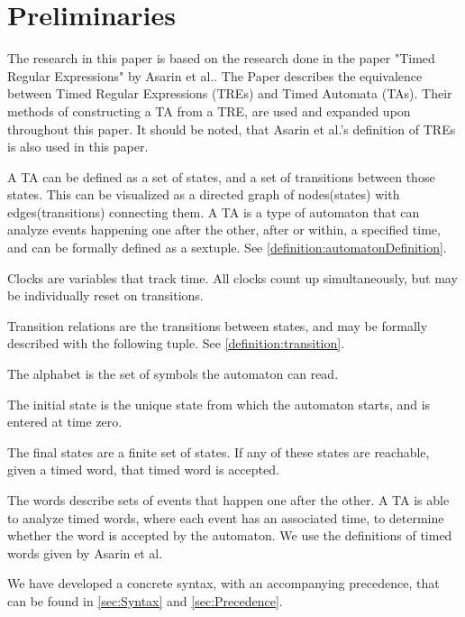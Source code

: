 \section{Preliminaries}\label{sec:preliminaries}






The research in this paper is based on the research done in the paper "Timed Regular Expressions" by Asarin et al.\cite{Eugene2001}. The Paper describes the equivalence between Timed Regular Expressions (TREs) and Timed Automata (TAs). Their methods of constructing a TA from a TRE, are used and expanded upon throughout this paper. It should be noted, that Asarin et al.'s definition of TREs is also used in this paper.

A TA can be defined as a set of states, and a set of transitions between those states. This can be visualized as a directed graph of nodes(states) with edges(transitions) connecting them.
A TA is a type of automaton that can analyze events happening one after the other, after or within, a specified time, and can be formally defined as a sextuple\cite{ALUR1994}. See \cref{definition:automatonDefinition}.


Clocks are variables that track time. All clocks count up simultaneously, but may be individually reset on transitions.

Transition relations are the transitions between states, and may be formally described with the following tuple. See \cref{definition:transition}.

The alphabet is the set of symbols the automaton can read.

The initial state is the unique state from which the automaton starts, and is entered at time zero.

The final states are a finite set of states. If any of these states are reachable, given a timed word, that timed word is accepted.

The words describe sets of events that happen one after the other. A TA is able to analyze timed words, where each event has an associated time, to determine whether the word is accepted by the automaton. We use the definitions of timed words given by Asarin et al. \cite{Eugene2001}



We have developed a concrete syntax, with an accompanying precedence, that can be found in \cref{sec:Syntax} and \cref{sec:Precedence}.
